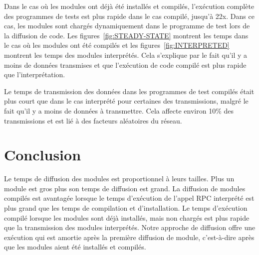 Dans le cas où les modules ont déjà été installés et compilés, l'exécution
complète des programmes de tests est plus rapide dans le cas compilé, jusqu'à
22x.  Dans ce cas, les modules sont chargés dynamiquement dans le programme de
test lors de la diffusion de code.  Les figures~\ref{fig:STEADY-STATE}
montrent les temps dans le cas où les modules ont été compilés et les
figures~\ref{fig:INTERPRETED} montrent les temps des modules interprétés.  Cela
s'explique par le fait qu'il y a moins de données transmises et que l'exécution
de code compilé est plus rapide que l'interprétation.

Le temps de transmission des données dans les programmes de test compilés était
plus court que dans le cas interprété pour certaines des transmissions, malgré
le fait qu'il y a moins de données à transmettre. Cela affecte environ 10\% des
transmissions et est lié à des facteurs aléatoires du réseau.

\section {Conclusion}

Le temps de diffusion des modules est proportionnel à leurs tailles.  Plus un
module est gros plus son temps de diffusion est grand.  La diffusion de modules
compilés est avantagée lorsque le temps d'exécution de l'appel RPC interprété
est plus grand que les temps de compilation et d'installation. Le temps
d'exécution compilé lorsque les modules sont déjà installés, mais non chargés
est plus rapide que la transmission des modules interprétés.  Notre approche de
diffusion offre une exécution qui est amortie après la première diffusion de module,
c'est-à-dire après que les modules aient été installés et compilés.





